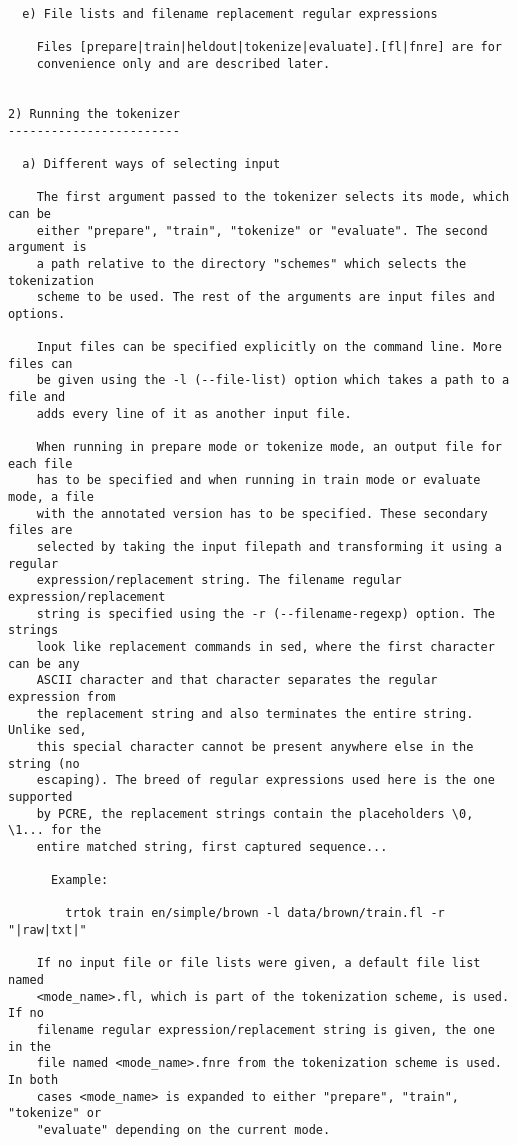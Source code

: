 \begin{tiny}
\begin{verbatim}
  e) File lists and filename replacement regular expressions

    Files [prepare|train|heldout|tokenize|evaluate].[fl|fnre] are for
    convenience only and are described later.
 

2) Running the tokenizer
------------------------

  a) Different ways of selecting input

    The first argument passed to the tokenizer selects its mode, which can be
    either "prepare", "train", "tokenize" or "evaluate". The second argument is
    a path relative to the directory "schemes" which selects the tokenization
    scheme to be used. The rest of the arguments are input files and options.

    Input files can be specified explicitly on the command line. More files can
    be given using the -l (--file-list) option which takes a path to a file and
    adds every line of it as another input file.

    When running in prepare mode or tokenize mode, an output file for each file
    has to be specified and when running in train mode or evaluate mode, a file
    with the annotated version has to be specified. These secondary files are
    selected by taking the input filepath and transforming it using a regular
    expression/replacement string. The filename regular expression/replacement
    string is specified using the -r (--filename-regexp) option. The strings
    look like replacement commands in sed, where the first character can be any
    ASCII character and that character separates the regular expression from
    the replacement string and also terminates the entire string. Unlike sed,
    this special character cannot be present anywhere else in the string (no
    escaping). The breed of regular expressions used here is the one supported
    by PCRE, the replacement strings contain the placeholders \0, \1... for the
    entire matched string, first captured sequence...
      
      Example:

        trtok train en/simple/brown -l data/brown/train.fl -r "|raw|txt|"

    If no input file or file lists were given, a default file list named
    <mode_name>.fl, which is part of the tokenization scheme, is used. If no
    filename regular expression/replacement string is given, the one in the
    file named <mode_name>.fnre from the tokenization scheme is used. In both
    cases <mode_name> is expanded to either "prepare", "train", "tokenize" or
    "evaluate" depending on the current mode.


\end{verbatim}
\end{tiny}
